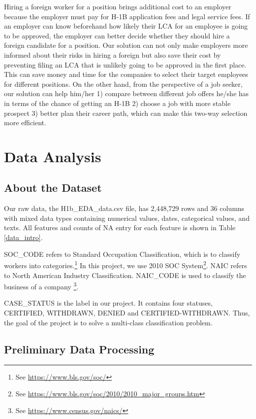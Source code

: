\documentclass{article}
\begin{document}
Hiring a foreign worker for a position brings additional cost to an employer because the employer must pay for H-1B application fees and legal service fees. If an employer can know beforehand how likely their LCA for an employee is going to be approved, the employer can better decide whether they should hire a foreign candidate for a position. Our solution can not only make employers more informed about their risks in hiring a foreign but also save their cost by preventing filing an LCA that is unlikely going to be approved in the first place. This can save money and time for the companies to select their target employees for different positions. On the other hand, from the perspective of a job seeker, our solution can help him/her 1) compare between different job offers he/she has in terms of the chance of getting an H-1B 2) choose a job with more stable prospect 3) better plan their career path, which can make this two-way selection more efficient.

\section{Data Analysis}

\subsection{About the Dataset}
Our raw data, the H1b\_EDA\_data.csv file, has 2,448,729 rows and 36 columns with mixed data types containing numerical values, dates, categorical values, and texts. All features and counts of NA entry for each feature is shown in Table \ref{data_intro}. 

SOC\_CODE refers to Standard Occupation Classification, which is to classify workers into  categories.\footnote{See \url{https://www.bls.gov/soc/}} In this project, we use 2010 SOC System\footnote{See \url{https://www.bls.gov/soc/2010/2010\_major\_groups.htm}}. NAIC refers to North American Industry Classification. NAIC\_CODE is used to classify the business of a company \footnote{See \url{https://www.census.gov/naics/}}. 

CASE\_STATUS is the label in our project. It contains four statuses, CERTIFIED, WITHDRAWN, DENIED and CERTIFIED-WITHDRAWN. Thus, the goal of the project is to solve a multi-class classification problem.

\subsection{Preliminary Data Processing}
\end{document}
